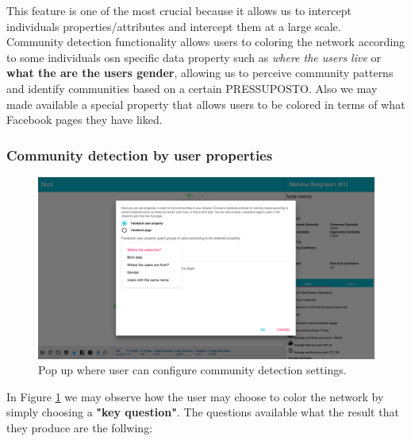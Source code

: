 This feature is one of the most crucial because it allows us to intercept individuals properties/attributes and intercept them at a large scale.\\
\indent Community detection functionality allows users to coloring the network according to some individuals \gls{osn} specific data property such as \textit{where the users live} or \textbf{what the are the users gender}, allowing us to perceive community patterns and identify communities based on a certain PRESSUPOSTO. Also we may made available a special property that allows users to be colored in terms of what Facebook pages they have liked.

\subsubsection*{Community detection by user properties}

\begin{figure}[h!]
\begin{center}
  \hspace*{-0.8in}
  \includegraphics[width=1.2\textwidth]{img/socii/socii_8.png}
\end{center}
\caption{\label{img:socii_8} Pop up where user can configure community detection settings.}
\end{figure}

In Figure \ref{img:socii_8} we may observe how the user may choose to color the network by simply choosing a \textbf{"key question"}. The questions available what the result that they produce are the follwing:

